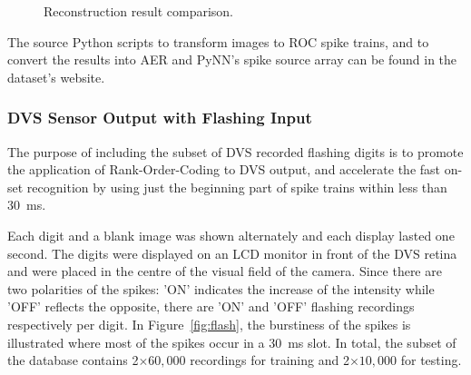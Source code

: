\documentclass{frontiersENG} %
\begin{document}
\begin{figure}[hbt]
	\centering
	\caption{Reconstruction result comparison.}
	\label{fig-reconstruction-results}
\end{figure}

The source Python scripts to transform images to ROC spike trains, and to convert the results into AER and PyNN's spike source array can be found in the dataset's website.
\subsubsection{DVS Sensor Output with Flashing Input}
\label{subsec_flash}
The purpose of including the subset of DVS recorded flashing digits is to promote the application of Rank-Order-Coding to DVS output, and accelerate the fast on-set recognition by using just the beginning part of spike trains within less than 30~ms.

Each digit and a blank image was shown alternately and each display lasted one second.
The digits were displayed on an LCD monitor in front of the DVS retina~\citep{serrano2013128} and were placed in the centre of the visual field of the camera.
Since there are two polarities of the spikes: 'ON' indicates the increase of the intensity while 'OFF' reflects the opposite, there are 'ON' and 'OFF' flashing recordings respectively per digit.
In Figure~\ref{fig:flash}, the burstiness of the spikes is illustrated where most of the spikes occur in a 30~ms slot. 
In total, the subset of the database contains 2$\times$$60,000$ recordings for training and 2$\times$$10,000$ for testing.
\end{document}
